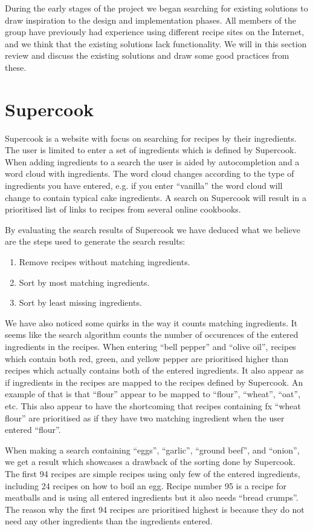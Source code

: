 During the early stages of the project we began searching for existing solutions to draw inspiration to the design and implementation phases. All members of the group have previously had experience using different recipe sites on the Internet, and we  think that the existing solutions lack functionality. We will in this section review and discuss the existing solutions and draw some good practices from these.  

\section{Supercook}
Supercook\cite{supercook} is a website with focus on searching for recipes by their ingredients. The user is limited to enter a set of ingredients which is defined by Supercook. When adding ingredients to a search the user is aided by autocompletion and a word cloud with ingredients. The word cloud changes according to the type of ingredients you have entered, e.g. if you enter ``vanilla'' the word cloud will change to contain typical cake ingredients. A search on Supercook will result in a prioritised list of links to recipes from several online cookbooks.

By evaluating the search results of Supercook we have deduced what we believe are the steps used to generate the search results:
\begin{enumerate}
	\item Remove recipes without matching ingredients.
	\item Sort by most matching ingredients.
	\item Sort by least missing ingredients.
\end{enumerate}
We have also noticed some quirks in the way it counts matching ingredients. It seems like the search algorithm counts the number of occurences of the entered ingredients in the recipes. When entering ``bell pepper'' and ``olive oil'', recipes which contain both red, green, and yellow pepper are prioritised higher than recipes which actually contains both of the entered ingredients. It also appear as if ingredients in the recipes are mapped to the recipes defined by Supercook. An example of that is that ``flour'' appear to be mapped to ``flour'', ``wheat'', ``oat'', etc. This also appear to have the shortcoming that recipes containing fx ``wheat flour'' are prioritised as if they have two matching ingredient when the user entered ``flour''.

When making a search containing ``eggs'', ``garlic'', ``ground beef'', and ``onion'', we get a result which showcases a drawback of the sorting done by Supercook. The first 94 recipes are simple recipes using only few of the entered ingredients, including 24 recipes on how to boil an egg. Recipe number 95 is a recipe for meatballs and is using all entered ingredients but it also needs ``bread crumps''. The reason why the first 94 recipes are prioritised highest is because they do not need any other ingredients than the ingredients entered.


